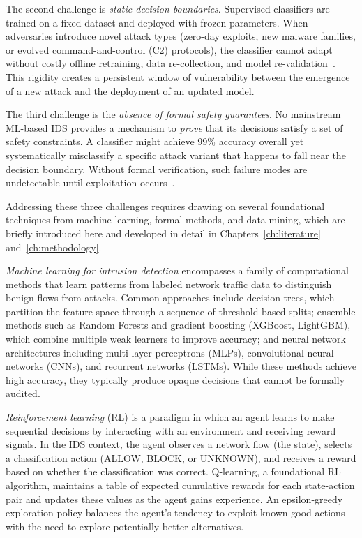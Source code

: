 \documentclass[12pt, letterpaper, oneside]{report}
\begin{document}
The second challenge is \emph{static decision boundaries}. Supervised classifiers are trained on a fixed dataset and deployed with frozen parameters. When adversaries introduce novel attack types (zero-day exploits, new malware families, or evolved command-and-control (C2) protocols), the classifier cannot adapt without costly offline retraining, data re-collection, and model re-validation~\cite{jordaney2017}. This rigidity creates a persistent window of vulnerability between the emergence of a new attack and the deployment of an updated model.

The third challenge is the \emph{absence of formal safety guarantees}. No mainstream ML-based IDS provides a mechanism to \emph{prove} that its decisions satisfy a set of safety constraints. A classifier might achieve 99\% accuracy overall yet systematically misclassify a specific attack variant that happens to fall near the decision boundary. Without formal verification, such failure modes are undetectable until exploitation occurs~\cite{alshiekh2018}.

Addressing these three challenges requires drawing on several foundational techniques from machine learning, formal methods, and data mining, which are briefly introduced here and developed in detail in Chapters~\ref{ch:literature} and~\ref{ch:methodology}.

\emph{Machine learning for intrusion detection} encompasses a family of computational methods that learn patterns from labeled network traffic data to distinguish benign flows from attacks. Common approaches include decision trees, which partition the feature space through a sequence of threshold-based splits; ensemble methods such as Random Forests and gradient boosting (XGBoost, LightGBM), which combine multiple weak learners to improve accuracy; and neural network architectures including multi-layer perceptrons (MLPs), convolutional neural networks (CNNs), and recurrent networks (LSTMs). While these methods achieve high accuracy, they typically produce opaque decisions that cannot be formally audited.

\emph{Reinforcement learning} (RL) is a paradigm in which an agent learns to make sequential decisions by interacting with an environment and receiving reward signals. In the IDS context, the agent observes a network flow (the state), selects a classification action (ALLOW, BLOCK, or UNKNOWN), and receives a reward based on whether the classification was correct. Q-learning, a foundational RL algorithm, maintains a table of expected cumulative rewards for each state-action pair and updates these values as the agent gains experience. An epsilon-greedy exploration policy balances the agent's tendency to exploit known good actions with the need to explore potentially better alternatives.
\end{document}
